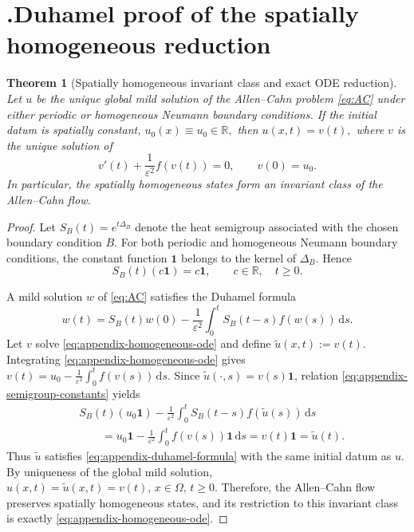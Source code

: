 \documentclass[final, 3p, times]{elsarticle}%
\newcommand{\eps}{\varepsilon}
\newtheorem{theorem}{Theorem}[section]
\begin{document}
\section*{\thesection.\quad Duhamel proof of the spatially homogeneous reduction}
\label{app:homogeneous-reduction}

\begin{theorem}[Spatially homogeneous invariant class and exact ODE reduction]
\label{thm:homogeneous-reduction}
Let $u$ be the unique global mild solution of the Allen--Cahn problem
\eqref{eq:AC} under either periodic or homogeneous Neumann boundary
conditions. If the initial datum is spatially constant,
$u_0(x)\equiv u_0\in\mathbb R,$
then
$
    u(x,t)=v(t),
$
where $v$ is the unique solution of
\begin{equation}
    v'(t)+\frac1{\eps^2}f(v(t))=0,
    \qquad v(0)=u_0.
    \label{eq:appendix-homogeneous-ode}
\end{equation}
In particular, the spatially homogeneous states form an invariant class
of the Allen--Cahn flow.
\end{theorem}

\begin{proof}
Let $S_B(t)=e^{t\Delta_B}$ denote the heat semigroup associated with the
chosen boundary condition $B$. For both periodic and homogeneous Neumann
boundary conditions, the constant function $\mathbf 1$ belongs to the
kernel of $\Delta_B$. Hence
\begin{equation}
    S_B(t)(c\mathbf 1)=c\mathbf 1,
    \qquad c\in\mathbb R,\quad t\ge0.
    \label{eq:appendix-semigroup-constants}
\end{equation}

A mild solution $w$ of \eqref{eq:AC} satisfies the Duhamel formula
\begin{equation}
    w(t)=S_B(t)w(0)
    -\frac1{\eps^2}\int_0^t S_B(t-s)f(w(s))\,\mathrm ds.
    \label{eq:appendix-duhamel-formula}
\end{equation}
Let $v$ solve \eqref{eq:appendix-homogeneous-ode} and define
$\widetilde u(x,t):=v(t).$
Integrating \eqref{eq:appendix-homogeneous-ode} gives
$ v(t)=u_0-\frac1{\eps^2}\int_0^t f(v(s))\,\mathrm ds.$
Since $\widetilde u(\cdot,s)=v(s)\mathbf 1$, relation
\eqref{eq:appendix-semigroup-constants} yields
\begin{align*}
&S_B(t)(u_0\mathbf 1)
-\frac1{\eps^2}\int_0^t
S_B(t-s)f(\widetilde u(s))\,\mathrm ds \\
&\qquad
=u_0\mathbf 1
-\frac1{\eps^2}\int_0^t f(v(s))\mathbf 1\,\mathrm ds
=v(t)\mathbf 1
=\widetilde u(t).
\end{align*}
Thus $\widetilde u$ satisfies \eqref{eq:appendix-duhamel-formula} with the
same initial datum as $u$. By uniqueness of the global mild solution,
$
    u(x,t)=\widetilde u(x,t)=v(t),
    \, x\in\Omega,\, t\ge0.
$
Therefore, the Allen--Cahn flow preserves spatially homogeneous states,
and its restriction to this invariant class is exactly
\eqref{eq:appendix-homogeneous-ode}.
\end{proof}
\end{document}

